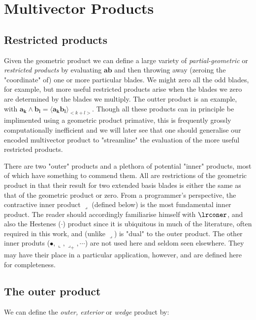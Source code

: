 \documentclass[a4paper]{book}
\numberwithin{equation}{chapter}
\begin{document}
    \chapter{Multivector Products}
    \section{Restricted products}

Given the geometric product we can define a large variety of \emph{partial-geometric}
or \emph{restricted products} by evaluating $\mathbf{ab}$ and then throwing away 
(zeroing the "coordinate" of) one or more 
particular blades. We might zero all the odd blades, for example, but more useful restricted 
products arise when the blades we zero are determined by the blades we multiply. The outter product 
is an example, with $\mathbf{a_k \wedge b_l} = \langle \mathbf{a_k b_l} \rangle_{<k+l>}$. 
Though all these products can in principle be implimented
using a geometric product primative, this is frequently grossly computationally inefficient and we 
will later see that one should generalise our encoded multivector product to "streamline" the 
evaluation of the more useful restricted products.

\vspace{\baselineskip}
 
There are two "outer" products and a plethora of potential "inner" products, most of which have 
something to commend them. All are restrictions of the geometric product in that their result for 
two extended basis blades is either the same as that of the geometric product or zero. From a
programmer's perspective, the contractive inner product $\lrcorner$ (defined below) is the most 
fundamental 
inner product. The reader should accordingly familiarise himself with $\lrconer$,
and also the Hestenes ($\cdot$)  product since it is ubiquitous in much of the literature,
often required in this work, and (unlike $\lrcorner$) is "dual" to the outer product.
The other inner produts ($\bullet, \llcorner,\lrcorner_{+}, \cdots$) are not used here and seldom
seen elsewhere. They may have their place in a particular application, however, and are defined here 
for completeness. 
    
    \section{The outer product}

We can define the \emph{outer, exterior} or \emph{wedge} product by:
\end{document}
